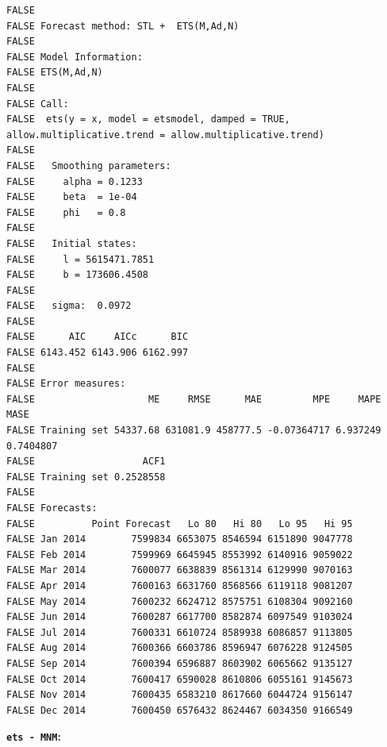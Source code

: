 \documentclass[openany]{book}
\begin{document}
\begin{verbatim}
FALSE 
FALSE Forecast method: STL +  ETS(M,Ad,N)
FALSE 
FALSE Model Information:
FALSE ETS(M,Ad,N) 
FALSE 
FALSE Call:
FALSE  ets(y = x, model = etsmodel, damped = TRUE, allow.multiplicative.trend = allow.multiplicative.trend) 
FALSE 
FALSE   Smoothing parameters:
FALSE     alpha = 0.1233 
FALSE     beta  = 1e-04 
FALSE     phi   = 0.8 
FALSE 
FALSE   Initial states:
FALSE     l = 5615471.7851 
FALSE     b = 173606.4508 
FALSE 
FALSE   sigma:  0.0972
FALSE 
FALSE      AIC     AICc      BIC 
FALSE 6143.452 6143.906 6162.997 
FALSE 
FALSE Error measures:
FALSE                    ME     RMSE      MAE         MPE     MAPE      MASE
FALSE Training set 54337.68 631081.9 458777.5 -0.07364717 6.937249 0.7404807
FALSE                   ACF1
FALSE Training set 0.2528558
FALSE 
FALSE Forecasts:
FALSE          Point Forecast   Lo 80   Hi 80   Lo 95   Hi 95
FALSE Jan 2014        7599834 6653075 8546594 6151890 9047778
FALSE Feb 2014        7599969 6645945 8553992 6140916 9059022
FALSE Mar 2014        7600077 6638839 8561314 6129990 9070163
FALSE Apr 2014        7600163 6631760 8568566 6119118 9081207
FALSE May 2014        7600232 6624712 8575751 6108304 9092160
FALSE Jun 2014        7600287 6617700 8582874 6097549 9103024
FALSE Jul 2014        7600331 6610724 8589938 6086857 9113805
FALSE Aug 2014        7600366 6603786 8596947 6076228 9124505
FALSE Sep 2014        7600394 6596887 8603902 6065662 9135127
FALSE Oct 2014        7600417 6590028 8610806 6055161 9145673
FALSE Nov 2014        7600435 6583210 8617660 6044724 9156147
FALSE Dec 2014        7600450 6576432 8624467 6034350 9166549
\end{verbatim}

\textbf{\texttt{ets\ -\ MNM}:}
\end{document}
